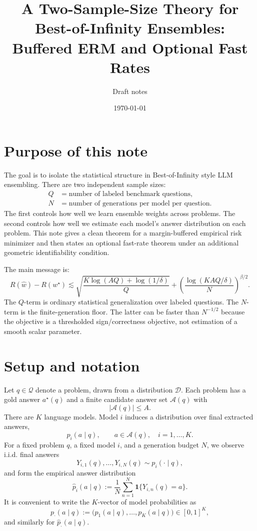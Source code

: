 \documentclass[11pt]{article}
\title{A Two-Sample-Size Theory for Best-of-Infinity Ensembles:\\ Buffered ERM and Optional Fast Rates}
\author{Draft notes}
\date{\today}
\newcommand{\Q}{\mathcal Q}
\newcommand{\A}{\mathcal A}
\newcommand{\D}{\mathcal D}
\newcommand{\one}{\mathbf 1}
\newcommand{\what}{\widehat w}
\newcommand{\wstar}{w^\star}
\begin{document}
\maketitle

\section{Purpose of this note}

The goal is to isolate the statistical structure in Best-of-Infinity style LLM ensembling.  There are two independent sample sizes:
\[
\begin{aligned}
Q &= \text{number of labeled benchmark questions},\\
N &= \text{number of generations per model per question}.
\end{aligned}
\]
The first controls how well we learn ensemble weights across problems.  The second controls how well we estimate each model's answer distribution on each problem.  This note gives a clean theorem for a margin-buffered empirical risk minimizer and then states an optional fast-rate theorem under an additional geometric identifiability condition.

The main message is:
\[
\boxed{
R(\what)-R(\wstar)
\lesssim
\sqrt{\frac{K\log(AQ)+\log(1/\delta)}{Q}}
+
\left(\frac{\log(KAQ/\delta)}{N}\right)^{\beta/2}.}
\]
The $Q$-term is ordinary statistical generalization over labeled questions.  The $N$-term is the finite-generation floor.  The latter can be faster than $N^{-1/2}$ because the objective is a thresholded sign/correctness objective, not estimation of a smooth scalar parameter.

\section{Setup and notation}

Let $q\in\Q$ denote a problem, drawn from a distribution $\D$.  Each problem has a gold answer $a^\star(q)$ and a finite candidate answer set $\A(q)$ with
\[
|\A(q)|\le A.
\]
There are $K$ language models.  Model $i$ induces a distribution over final extracted answers,
\[
p_i(a\mid q),\qquad a\in\A(q),\quad i=1,\dots,K.
\]
For a fixed problem $q$, a fixed model $i$, and a generation budget $N$, we observe i.i.d. final answers
\[
Y_{i,1}(q),\dots,Y_{i,N}(q)\sim p_i(\cdot\mid q),
\]
and form the empirical answer distribution
\[
\widehat p_i(a\mid q)
:=
\frac1N\sum_{n=1}^N \one\{Y_{i,n}(q)=a\}.
\]
It is convenient to write the $K$-vector of model probabilities as
\[
p_\cdot(a\mid q)
:=
\big(p_1(a\mid q),\dots,p_K(a\mid q)\big)\in[0,1]^K,
\]
and similarly for $\widehat p_\cdot(a\mid q)$.
\end{document}
